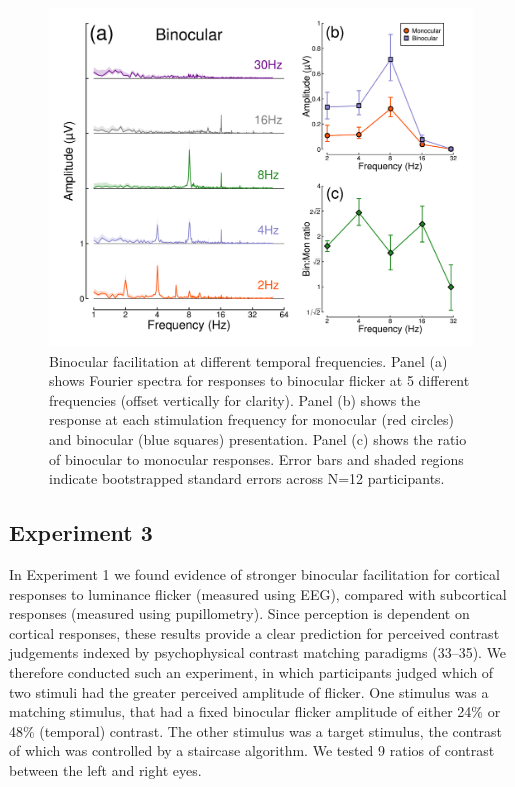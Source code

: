 \documentclass[
]{article}
\begin{document}
\begin{figure}

{\centering \includegraphics{Figures/TFdata} 

}

\caption{Binocular facilitation at different temporal frequencies. Panel (a) shows Fourier spectra for responses to binocular flicker at 5 different frequencies (offset vertically for clarity). Panel (b) shows the response at each stimulation frequency for monocular (red circles) and binocular (blue squares) presentation. Panel (c) shows the ratio of binocular to monocular responses. Error bars and shaded regions indicate bootstrapped standard errors across N=12 participants.}\label{fig:TFdata}
\end{figure}

\hypertarget{experiment-3}{%
\subsection{Experiment 3}\label{experiment-3}}

In Experiment 1 we found evidence of stronger binocular facilitation for cortical responses to luminance flicker (measured using EEG), compared with subcortical responses (measured using pupillometry). Since perception is dependent on cortical responses, these results provide a clear prediction for perceived contrast judgements indexed by psychophysical contrast matching paradigms (33--35). We therefore conducted such an experiment, in which participants judged which of two stimuli had the greater perceived amplitude of flicker. One stimulus was a matching stimulus, that had a fixed binocular flicker amplitude of either 24\% or 48\% (temporal) contrast. The other stimulus was a target stimulus, the contrast of which was controlled by a staircase algorithm. We tested 9 ratios of contrast between the left and right eyes.
\end{document}
